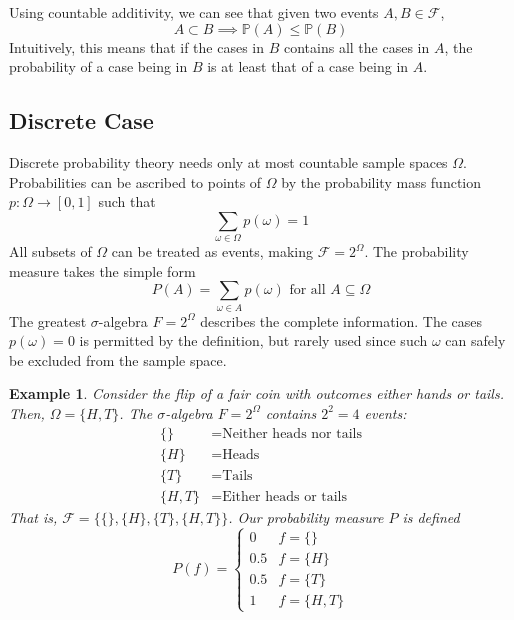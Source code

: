 \documentclass{article}
\newtheorem{example}{Example}[section]
\theoremstyle{remark}
\theoremstyle{definition}
\begin{document}
Using countable additivity, we can see that given two events $A, B \in \mathcal{F}$, 
\[A \subset B \implies \mathbb{P}(A) \leq \mathbb{P}(B)\]
Intuitively, this means that if the cases in $B$ contains all the cases in $A$, the probability of a case being in $B$ is at least that of a case being in $A$. 

\subsection{Discrete Case}
Discrete probability theory needs only at most countable sample spaces $\Omega$. Probabilities can be ascribed to points of $\Omega$ by the probability mass function $p: \Omega \longrightarrow [0,1]$ such that
\[\sum_{\omega \in \Omega} p(\omega) = 1\]
All subsets of $\Omega$ can be treated as events, making $\mathcal{F} = 2^{\Omega}$. The probability measure takes the simple form 
\[P(A) = \sum_{\omega \in A} p(\omega) \text{ for all } A \subseteq \Omega\]
The greatest $\sigma$-algebra $F = 2^{\Omega}$ describes the complete information. The cases $p(\omega) = 0$ is permitted by the definition, but rarely used since such $\omega$ can safely be excluded from the sample space. 

\begin{example}
Consider the flip of a fair coin with outcomes either hands or tails. Then, $\Omega = \{H, T\}$. The $\sigma$-algebra $F = 2^{\Omega}$ contains $2^2 = 4$ events: 
\begin{align*}
    \{\} &= \text{Neither heads nor tails} \\
    \{H\} &= \text{Heads} \\
    \{T\} &= \text{Tails} \\
    \{H, T\} &= \text{Either heads or tails}
\end{align*}
That is, $\mathcal{F} = \{\{\}, \{H\}, \{T\}, \{H, T\}\}$. Our probability measure $P$ is defined
\[P(f) = \begin{cases}
0 & f = \{\} \\
0.5 & f = \{H\} \\
0.5 & f = \{T\} \\
1 & f = \{H, T\}
\end{cases}\]
\end{example}
\end{document}
